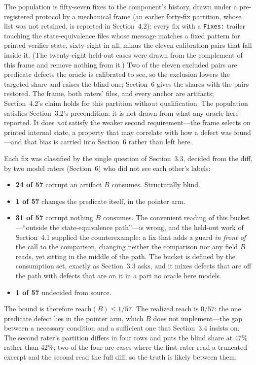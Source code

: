The population is fifty-seven fixes to the component's history, drawn under a
pre-registered protocol by a mechanical frame (an earlier forty-fix partition, whose
list was not retained, is reported in Section~4.2): every fix with a \texttt{Fixes:}
trailer touching the state-equivalence files whose message matches a fixed pattern for
printed verifier state, sixty-eight in all, minus the eleven calibration pairs that fall
inside it. (The twenty-eight held-out cases were drawn from the complement of this
frame and remove nothing from it.) Two of the eleven excluded pairs are predicate
defects the oracle is calibrated to see, so the exclusion lowers the targeted share and
raises the blind one; Section~6 gives the shares with the pairs restored. The frame,
both raters' files, and every anchor are artifacts; Section~4.2's claim holds for
this partition without qualification. The population satisfies Section~3.2's
precondition: it is not drawn from what any oracle here reported. It does
\emph{not} satisfy the weaker second requirement---the frame selects on printed
internal state, a property that may correlate with how a defect was found---and that
bias is carried into Section~6 rather than left here.

Each fix was classified by the single question of Section~3.3, decided from the
diff, by two model raters (Section~6) who did not see each other's labels:

\begin{itemize}
\item \textbf{24 of 57} corrupt an artifact $B$ consumes. Structurally blind.
\item \textbf{1 of 57} changes the predicate itself, in the pointer arm.
\item \textbf{31 of 57} corrupt nothing $B$ consumes. The convenient reading of
this bucket---``outside the state-equivalence path''---is wrong, and the held-out
work of Section~4.1 supplied the counterexample: a fix that adds a guard
\emph{in front of} the call to the comparison, changing neither the comparison nor
any field $B$ reads, yet sitting in the middle of the path. The bucket is defined by
the consumption set, exactly as Section~3.3 asks, and it mixes defects that are off
the path with defects that are on it in a part no oracle here models.
\item \textbf{1 of 57} undecided from source.
\end{itemize}

The bound is therefore $\mathrm{reach}(B) \le 1/57$. The realized reach is $0/57$:
the one predicate defect lies in the pointer arm, which $B$ does not implement---the
gap between a necessary condition and a sufficient one that Section~3.4 insists on.
The second rater's partition differs in four rows and puts the blind share at 47\%
rather than 42\%; two of the four are cases where the first rater read a truncated
excerpt and the second read the full diff, so the truth is likely between them.

